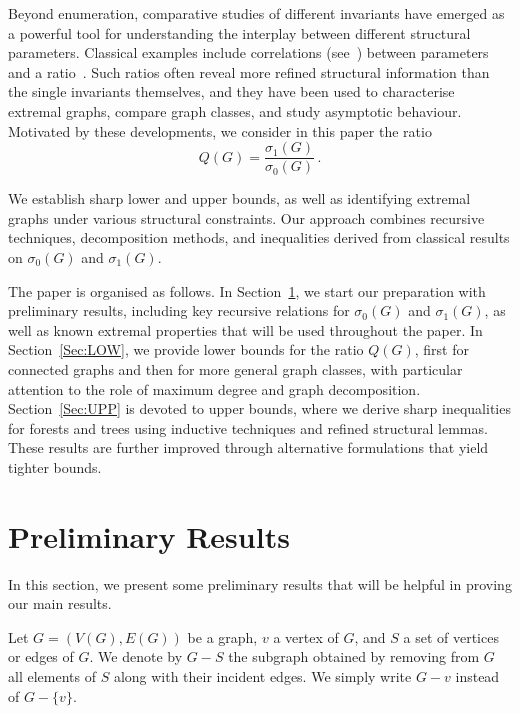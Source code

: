 \documentclass[a4paper,12pt]{amsart}
\begin{document}
Beyond enumeration, comparative studies of different invariants have emerged as a powerful tool for understanding the interplay between different structural parameters. Classical examples include correlations (see~\cite{Wagner2007Correlation}) between parameters and a ratio~\cite{WienerRatio2023}. Such ratios often reveal more refined structural information than the single invariants themselves, and they have been used to characterise extremal graphs, compare graph classes, and study asymptotic behaviour. Motivated by these developments, we consider in this paper the ratio
\[
Q(G) = \frac{\sigma_1(G)}{\sigma_0(G)}\,.
\]

We establish sharp lower and upper bounds, as well as identifying extremal graphs under various structural constraints. Our approach combines recursive techniques, decomposition methods, and inequalities derived from classical results on $\sigma_0(G)$ and $\sigma_1(G)$.

The paper is organised as follows. In Section~\ref{Sec:PRE}, we start our preparation with preliminary results, including key recursive relations for $\sigma_0(G)$ and $\sigma_1(G)$, as well as known extremal properties that will be used throughout the paper. In Section~\ref{Sec:LOW}, we provide lower bounds for the ratio $Q(G)$, first for connected graphs and then for more general graph classes, with particular attention to the role of maximum degree and graph decomposition. Section~\ref{Sec:UPP} is devoted to upper bounds, where we derive sharp inequalities for forests and trees using inductive techniques and refined structural lemmas. These results are further improved through alternative formulations that yield tighter bounds.

\section{Preliminary Results}
\label{Sec:PRE}
In this section, we present some preliminary results that will be helpful in proving our main results. 

Let $G=(V(G), E(G))$ be a graph, $v$ a vertex of $G$, and $S$ a set of vertices or edges of $G$. We denote by $G-S$ the subgraph obtained by removing from $G$ all elements of $S$ along with their incident edges.  We simply write $G-v$ instead of $G-\{v\}$. %
\end{document}
